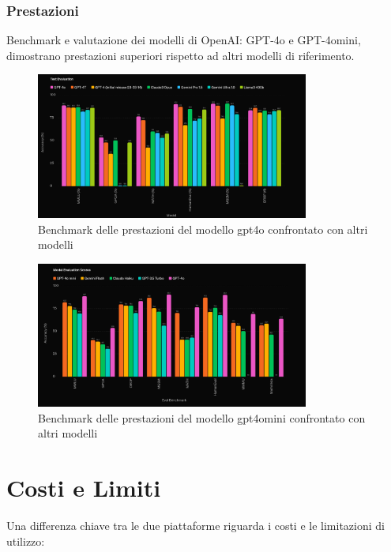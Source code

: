 \documentclass{article}
\begin{document}
\subsubsection{Prestazioni}
Benchmark e valutazione dei modelli di OpenAI: GPT-4o e GPT-4omini, dimostrano prestazioni superiori rispetto ad altri modelli di riferimento.

\begin{figure}[H]
    \centering
    \includegraphics[width=0.8\textwidth]{img/performance_benchmark_gpt4o.png}
    \caption{Benchmark delle prestazioni del modello gpt4o confrontato con altri modelli}
    \label{fig:performance_benchmark_gpt4o}
\end{figure}

\begin{figure}[H]
    \centering
    \includegraphics[width=0.8\textwidth]{img/performance_benchmark_gpt4omini.png}
    \caption{Benchmark delle prestazioni del modello gpt4omini confrontato con altri modelli}
    \label{fig:performance_benchmark_gpt4omini}
\end{figure}

\section{Costi e Limiti}
Una differenza chiave tra le due piattaforme riguarda i costi e le limitazioni di utilizzo:
\end{document}
